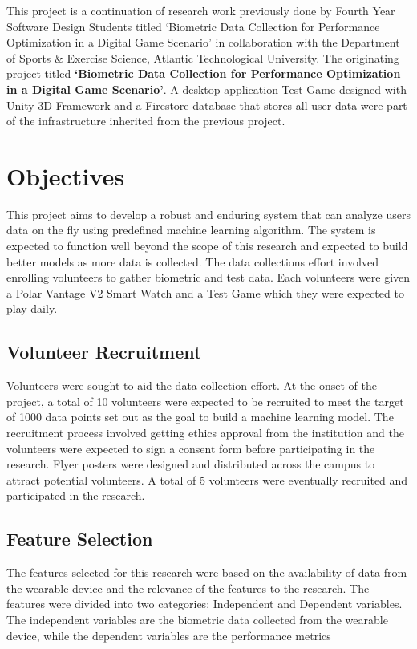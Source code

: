 This project is a continuation of research work previously done by Fourth Year Software Design Students titled `Biometric
Data Collection for Performance Optimization in a Digital Game Scenario' in collaboration with the Department of Sports
\& Exercise Science, Atlantic Technological University.
The originating project titled \textbf{`Biometric Data Collection for Performance Optimization in a Digital
    Game Scenario'}. A desktop application Test Game designed with Unity 3D Framework and a Firestore database
that stores all user data were part of the infrastructure inherited from the previous project.

\section{Objectives}
This project aims to develop a robust and enduring system that can analyze users data on the fly using predefined machine learning
algorithm. The system is expected to function well beyond the scope of this research and expected to build better models as more data
is collected. The data collections effort involved enrolling volunteers to gather biometric and test data. Each volunteers were given
a Polar Vantage V2 Smart Watch and a Test Game  which they were expected to play daily.

\subsection{Volunteer Recruitment}
Volunteers were sought to aid the data collection effort. At the onset of the project, a total of 10 volunteers were expected to be recruited
to meet the target of 1000 data points set out as the goal to build a machine learning model. The recruitment process involved getting
ethics approval from the institution and the volunteers were expected to sign a consent form before participating in the research. 
Flyer posters were designed and distributed across the campus to attract potential volunteers. A total of 5 volunteers were eventually 
recruited and participated in the research. 

\subsection{Feature Selection}
The features selected for this research were based on the availability of data from the wearable device and the relevance of the
features to the research. The features were divided into two categories: Independent and Dependent variables. The independent
variables are the biometric data collected from the wearable device, while the dependent variables are the performance metrics


